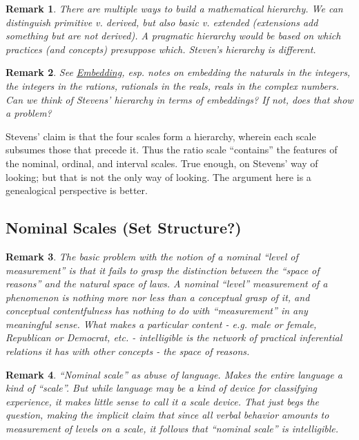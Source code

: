 \documentclass[11pt,twoside]{article}
\newtheorem{remark}{Remark}
\begin{document}
\begin{remark}
  There are multiple ways to build a mathematical hierarchy.  We can
  distinguish primitive v. derived, but also basic v. extended
  (extensions add something but are not derived).  A pragmatic
  hierarchy would be based on which practices (and concepts)
  presuppose which.  Steven's hierarchy is different.
\end{remark}

\begin{remark}
  See \href{http://en.wikipedia.org/wiki/Embedding}{Embedding},
  esp. notes on embedding the naturals in the integers, the integers
  in the rations, rationals in the reals, reals in the complex
  numbers.  Can we think of Stevens' hierarchy in terms of embeddings?
  If not, does that show a problem?
\end{remark}

Stevens' claim is that the four scales form a hierarchy, wherein each
scale subsumes those that precede it.  Thus the ratio scale
``contains'' the features of the nominal, ordinal, and interval
scales.  True enough, on Stevens' way of looking; but that is not the
only way of looking.  The argument here is a genealogical perspective
is better.

\subsection{Nominal Scales (Set Structure?)}

\begin{remark}
  The basic problem with the notion of a nominal ``level of
  measurement'' is that it fails to grasp the distinction between the
  ``space of reasons'' and the natural space of laws.  A nominal
  ``level'' measurement of a phenomenon is nothing more nor less than
  a conceptual grasp of it, and conceptual contentfulness has nothing
  to do with ``measurement'' in any meaningful sense.  What makes a
  particular content - e.g. male or female, Republican or Democrat,
  etc. - intelligible is the network of practical inferential
  relations it has with other concepts - the space of reasons.
\end{remark}

\begin{remark}
  ``Nominal scale'' as abuse of language.  Makes the entire language a
  kind of ``scale''.  But while language may be a kind of device for
  classifying experience, it makes little sense to call it a scale
  device.  That just begs the question, making the implicit claim that
  since all verbal behavior amounts to measurement of levels on a
  scale, it follows that ``nominal scale'' is intelligible.
\end{remark}
\end{document}
